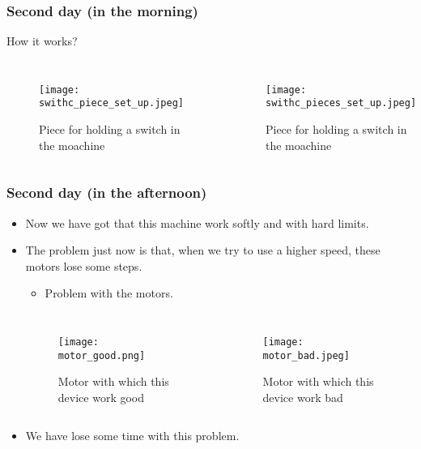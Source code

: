\documentclass{beamer}
\begin{document}
\begin{frame}
\frametitle{Second day (in the morning)}
How it works?
\begin{columns}

\begin{figure}[hbtp]
\centering
\texttt{[image: swithc\_piece\_set\_up.jpeg]}
\caption{Piece for holding a switch in the moachine}
\end{figure}


\begin{figure}[hbtp]
\centering
\texttt{[image: swithc\_pieces\_set\_up.jpeg]}
\caption{Piece for holding a switch in the moachine}
\end{figure}

\end{columns}
\end{frame}


\begin{frame}
\frametitle{Second day (in the afternoon)}
\begin{itemize}
\item{} Now we have got that this machine work softly and with hard limits.
\item{} The problem just now is that, when we try to use a higher speed, these motors lose some steps.
\begin{itemize}
\item{} Problem with the motors. 
\end{itemize}


\begin{columns}

\begin{figure}[hbtp]
\centering
\texttt{[image: motor\_good.png]}
\caption{Motor with which this device work good}
\end{figure}


\begin{figure}[hbtp]
\centering
\texttt{[image: motor\_bad.jpeg]}
\caption{Motor with which this device work bad}
\end{figure}

\end{columns}

\item{} We have lose some time with this problem.
\end{itemize}
\end{frame}
\end{document}
